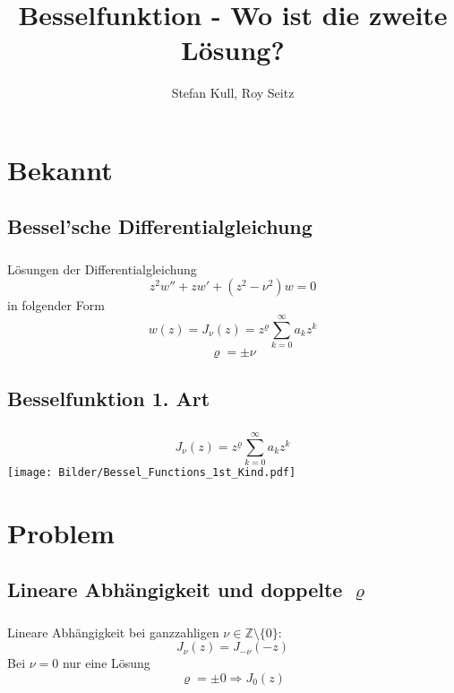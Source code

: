 \documentclass{beamer}
\author{Stefan Kull, Roy Seitz}
\title{Besselfunktion - Wo ist die zweite Lösung?}
\newenvironment{slide}
{\begin{frame}[environment=slide]
	\frametitle{\insertsection}
	\framesubtitle{\insertsubsection}}
{\end{frame}}
\begin{document}
	
	\begin{slide}
		\titlepage
	\end{slide}
	
	
\section{Bekannt}	
\subsection{Bessel'sche Differentialgleichung}	
	\begin{slide}
		Lösungen der Differentialgleichung
		$$ z^2w''+zw'+(z^2-\nu^2)w=0 $$
		in folgender Form
		$$
		w(z)=J_\nu(z)=z^\varrho\sum_{k=0}^{\infty}a_kz^k 
		$$ $$
		\varrho=\pm\nu
		$$
	\end{slide}
	

\subsection{Besselfunktion 1. Art}
	\begin{slide}
		\centering
		$$J_\nu(z)=z^\varrho\sum_{k=0}^{\infty}a_kz^k$$
		\texttt{[image: Bilder/Bessel\_Functions\_1st\_Kind.pdf]}
	\end{slide}

\section{Problem}
\subsection{Lineare Abhängigkeit und doppelte $\varrho$}
	\begin{slide}
		Lineare Abhängigkeit bei ganzzahligen $\nu\in\mathbb{Z}\setminus\{0\}$:
		$$J_\nu(z) = J_{-\nu}(-z)$$
		Bei $\nu=0$ nur eine Lösung
		$$\varrho=\pm 0\Rightarrow J_0(z)$$
	\end{slide}
	
\end{document}
